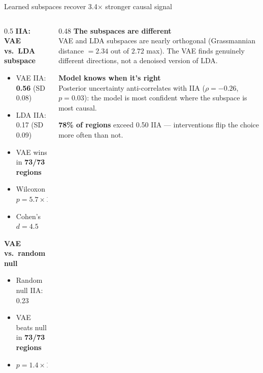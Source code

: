 \documentclass[aspectratio=169,11pt]{beamer}
\begin{document}
\begin{frame}{Learned subspaces recover 3.4$\times$ stronger causal signal}
\begin{columns}[T]
\begin{column}{0.5\textwidth}
\textbf{IIA: VAE vs.\ LDA subspace}
\begin{itemize}\setlength\itemsep{1pt}
  \item VAE IIA: \textbf{0.56} (SD 0.08)
  \item LDA IIA: 0.17 (SD 0.09)
  \item VAE wins in \textbf{73/73 regions}
  \item Wilcoxon $p = 5.7 \times 10^{-14}$
  \item Cohen's $d = 4.5$
\end{itemize}

\vspace{0.3em}
\textbf{VAE vs.\ random null}
\begin{itemize}\setlength\itemsep{1pt}
  \item Random null IIA: 0.23
  \item VAE beats null in \textbf{73/73 regions}
  \item $p = 1.4 \times 10^{-25}$
\end{itemize}
\end{column}
\begin{column}{0.48\textwidth}
\textbf{The subspaces are different}\\[0.3em]
{\small VAE and LDA subspaces are nearly orthogonal (Grassmannian distance $= 2.34$ out of $2.72$ max). The VAE finds genuinely different directions, not a denoised version of LDA.}

\vspace{0.5em}
\textbf{Model knows when it's right}\\[0.3em]
{\small Posterior uncertainty anti-correlates with IIA ($\rho = -0.26$, $p = 0.03$): the model is most confident where the subspace is most causal.}

\vspace{0.5em}
\textbf{78\% of regions} exceed 0.50 IIA --- interventions flip the choice more often than not.
\end{column}
\end{columns}
\end{frame}
\end{document}
